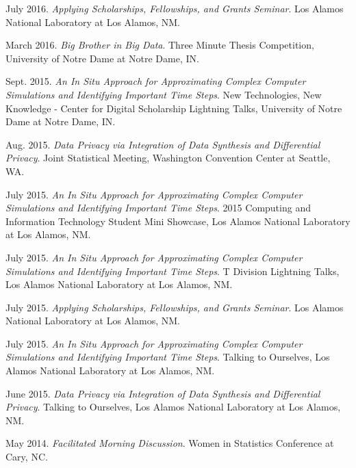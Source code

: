\documentclass[11pt, letterpaper, roman]{moderncv} %
\begin{document}
\begin{etaremune}[topsep=0pt, itemsep=5pt, partopsep=0pt, parsep=0pt]
    \item July 2016. \textit{Applying Scholarships, Fellowships, and Grants Seminar}. Los Alamos National Laboratory at Los Alamos, NM.
    
    \item March 2016. \textit{Big Brother in Big Data}. Three Minute Thesis Competition, University of Notre Dame at Notre Dame, IN.
    
    \item Sept. 2015. \textit{An In Situ Approach for Approximating Complex Computer Simulations and Identifying Important Time Steps}. New Technologies, New Knowledge - Center for Digital Scholarship Lightning Talks, University of Notre Dame at Notre Dame, IN.
    
    \item Aug. 2015. \textit{Data Privacy via Integration of Data Synthesis and Differential Privacy}. Joint Statistical Meeting, Washington Convention Center at Seattle, WA.
    
    \item July 2015. \textit{An In Situ Approach for Approximating Complex Computer Simulations and Identifying Important Time Steps}. 2015 Computing and Information Technology Student Mini Showcase, Los Alamos National Laboratory at Los Alamos, NM.
    
    \item July 2015. \textit{An In Situ Approach for Approximating Complex Computer Simulations and Identifying Important Time Steps}. T Division Lightning Talks, Los Alamos National Laboratory at Los Alamos, NM.
    
    \item July 2015. \textit{Applying Scholarships, Fellowships, and Grants Seminar}. Los Alamos National Laboratory at Los Alamos, NM.
    
    \item July 2015. \textit{An In Situ Approach for Approximating Complex Computer Simulations and Identifying Important Time Steps}. Talking to Ourselves, Los Alamos National Laboratory at Los Alamos, NM.
    
    \item June 2015. \textit{Data Privacy via Integration of Data Synthesis and Differential Privacy}. Talking to Ourselves, Los Alamos National Laboratory at Los Alamos, NM. 
    
    \item May 2014. \textit{Facilitated Morning Discussion}. Women in Statistics Conference at Cary, NC.
    

\end{etaremune}
\end{document}
